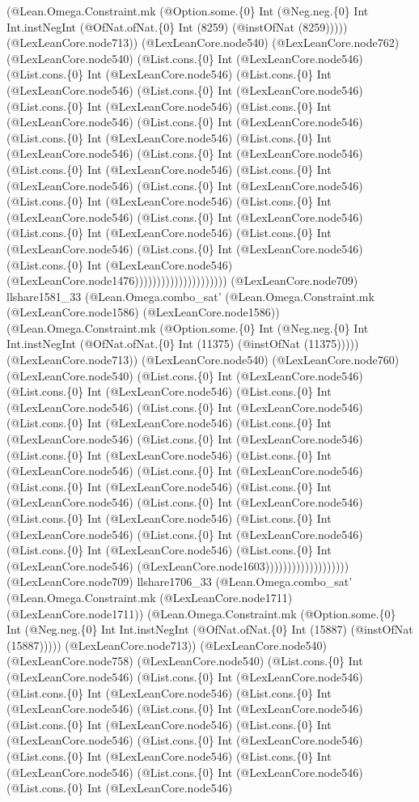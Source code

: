 \documentclass[11pt]{article}
\begin{document}
(@Lean.Omega.Constraint.mk (@Option.some.\{0\} Int (@Neg.neg.\{0\} Int Int.instNegInt (@OfNat.ofNat.\{0\} Int (8259) (@instOfNat (8259))))) (@LexLeanCore.node713)) (@LexLeanCore.node540) (@LexLeanCore.node762) (@LexLeanCore.node540) (@List.cons.\{0\} Int (@LexLeanCore.node546) (@List.cons.\{0\} Int (@LexLeanCore.node546) (@List.cons.\{0\} Int (@LexLeanCore.node546) (@List.cons.\{0\} Int (@LexLeanCore.node546) (@List.cons.\{0\} Int (@LexLeanCore.node546) (@List.cons.\{0\} Int (@LexLeanCore.node546) (@List.cons.\{0\} Int (@LexLeanCore.node546) (@List.cons.\{0\} Int (@LexLeanCore.node546) (@List.cons.\{0\} Int (@LexLeanCore.node546) (@List.cons.\{0\} Int (@LexLeanCore.node546) (@List.cons.\{0\} Int (@LexLeanCore.node546) (@List.cons.\{0\} Int (@LexLeanCore.node546) (@List.cons.\{0\} Int (@LexLeanCore.node546) (@List.cons.\{0\} Int (@LexLeanCore.node546) (@List.cons.\{0\} Int (@LexLeanCore.node546) (@List.cons.\{0\} Int (@LexLeanCore.node546) (@List.cons.\{0\} Int (@LexLeanCore.node546) (@List.cons.\{0\} Int (@LexLeanCore.node546) (@List.cons.\{0\} Int (@LexLeanCore.node546) (@List.cons.\{0\} Int (@LexLeanCore.node546) (@LexLeanCore.node1476))))))))))))))))))))) (@LexLeanCore.node709) llshare1581\_33 (@Lean.Omega.combo\_sat' (@Lean.Omega.Constraint.mk (@LexLeanCore.node1586) (@LexLeanCore.node1586)) (@Lean.Omega.Constraint.mk (@Option.some.\{0\} Int (@Neg.neg.\{0\} Int Int.instNegInt (@OfNat.ofNat.\{0\} Int (11375) (@instOfNat (11375))))) (@LexLeanCore.node713)) (@LexLeanCore.node540) (@LexLeanCore.node760) (@LexLeanCore.node540) (@List.cons.\{0\} Int (@LexLeanCore.node546) (@List.cons.\{0\} Int (@LexLeanCore.node546) (@List.cons.\{0\} Int (@LexLeanCore.node546) (@List.cons.\{0\} Int (@LexLeanCore.node546) (@List.cons.\{0\} Int (@LexLeanCore.node546) (@List.cons.\{0\} Int (@LexLeanCore.node546) (@List.cons.\{0\} Int (@LexLeanCore.node546) (@List.cons.\{0\} Int (@LexLeanCore.node546) (@List.cons.\{0\} Int (@LexLeanCore.node546) (@List.cons.\{0\} Int (@LexLeanCore.node546) (@List.cons.\{0\} Int (@LexLeanCore.node546) (@List.cons.\{0\} Int (@LexLeanCore.node546) (@List.cons.\{0\} Int (@LexLeanCore.node546) (@List.cons.\{0\} Int (@LexLeanCore.node546) (@List.cons.\{0\} Int (@LexLeanCore.node546) (@List.cons.\{0\} Int (@LexLeanCore.node546) (@List.cons.\{0\} Int (@LexLeanCore.node546) (@List.cons.\{0\} Int (@LexLeanCore.node546) (@LexLeanCore.node1603))))))))))))))))))) (@LexLeanCore.node709) llshare1706\_33 (@Lean.Omega.combo\_sat' (@Lean.Omega.Constraint.mk (@LexLeanCore.node1711) (@LexLeanCore.node1711)) (@Lean.Omega.Constraint.mk (@Option.some.\{0\} Int (@Neg.neg.\{0\} Int Int.instNegInt (@OfNat.ofNat.\{0\} Int (15887) (@instOfNat (15887))))) (@LexLeanCore.node713)) (@LexLeanCore.node540) (@LexLeanCore.node758) (@LexLeanCore.node540) (@List.cons.\{0\} Int (@LexLeanCore.node546) (@List.cons.\{0\} Int (@LexLeanCore.node546) (@List.cons.\{0\} Int (@LexLeanCore.node546) (@List.cons.\{0\} Int (@LexLeanCore.node546) (@List.cons.\{0\} Int (@LexLeanCore.node546) (@List.cons.\{0\} Int (@LexLeanCore.node546) (@List.cons.\{0\} Int (@LexLeanCore.node546) (@List.cons.\{0\} Int (@LexLeanCore.node546) (@List.cons.\{0\} Int (@LexLeanCore.node546) (@List.cons.\{0\} Int (@LexLeanCore.node546) (@List.cons.\{0\} Int (@LexLeanCore.node546) (@List.cons.\{0\} Int (@LexLeanCore.node546) 
\end{document}
